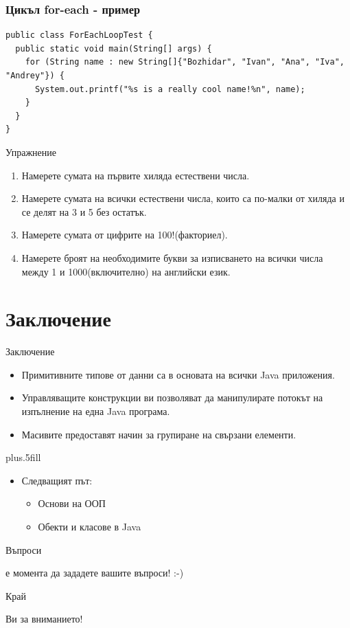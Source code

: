 \documentclass{beamer}
\begin{document}
\begin{frame}[fragile]
  \frametitle{Цикъл for-each - пример}
  \transdissolve
\begin{lstlisting}
public class ForEachLoopTest {
  public static void main(String[] args) {
    for (String name : new String[]{"Bozhidar", "Ivan", "Ana", "Iva", "Andrey"}) {
      System.out.printf("%s is a really cool name!%n", name);
    }
  }
}  
\end{lstlisting}
\end{frame}

\begin{frame}{Упражнение}
  \transdissolve  
  \begin{enumerate}
    \item Намерете сумата на първите хиляда естествени числа. \pause
    \item Намерете сумата на всички естествени числа, които са
      по-малки от хиляда и се делят на 3 и 5 без остатък. \pause
    \item Намерете сумата от цифрите на 100!(факториел). \pause
    \item Намерете броят на необходимите букви за изписването на
      всички числа между 1 и 1000(включително) на английски език.
  \end{enumerate}

\end{frame}

\section*{Заключение}

\begin{frame}{Заключение}
  \transdissolve
  \begin{itemize}
  \item
    Примитивните типове от данни са в основата на \alert{всички} Java приложения.
  \item
    Управляващите конструкции ви позволяват да манипулирате потокът на
    изпълнение на една Java програма.
  \item
    Масивите предоставят начин за групиране на свързани елементи.
  \end{itemize}
  
  \vskip0pt plus.5fill
  \begin{itemize}
  \item
    Следващият път:
    \begin{itemize}
    \item
      Основи на ООП
    \item
      Обекти и класове в Java
    \end{itemize}
  \end{itemize}
\end{frame}


\begin{frame}{Въпроси}
  \transdissolve
  \begin{center}
     е момента да зададете вашите въпроси! :-)
  \end{center}
\end{frame}


\begin{frame}{Край}
  \transdissolve
  \begin{center}
     Ви за вниманието!
  \end{center}
  
\end{frame}
\end{document}
